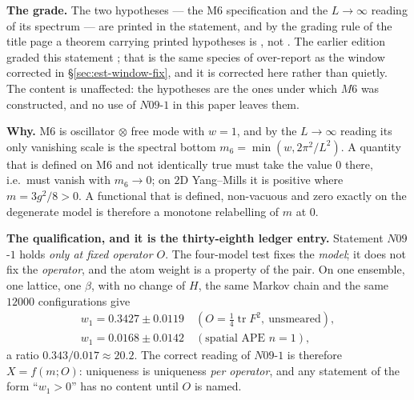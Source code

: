 \noindent\textbf{The grade.} The two hypotheses --- the M6 specification and the $L\to\infty$ reading
of its spectrum --- are printed in the statement, and by the grading rule of the title page a theorem
carrying printed hypotheses is \LC, not \LT. The earlier edition graded this statement \LT; that is
the same species of over-report as the window corrected in \S\ref{sec:est-window-fix}, and it is
corrected here rather than quietly. The content is unaffected: the hypotheses are the ones under
which $M6$ was constructed, and no use of $N09$-$1$ in this paper leaves them.

\noindent\textbf{Why.} M6 is oscillator $\otimes$ free mode with $w=1$, and by the $L\to\infty$
reading its only vanishing scale is the spectral bottom $m_6=\min(w,2\pi^2/L^2)$. A quantity that is
defined on M6 and not identically true must take the value $0$ there, i.e.\ must vanish with
$m_6\to0$; on $2$D Yang--Mills it is positive where $m=3g^2/8>0$. A functional that is defined,
non-vacuous and zero exactly on the degenerate model is therefore a monotone relabelling of $m$ at
$0$. 

\smallskip
\noindent\textbf{The qualification, and it is the thirty-eighth ledger entry.} Statement
$N09$-$1$ holds \emph{only at fixed operator $O$}. The four-model test fixes the \emph{model}; it
does not fix the \emph{operator}, and the atom weight is a property of the pair. On one ensemble, one
lattice, one $\beta$, with no change of $H$, the same Markov chain and the same $12000$
configurations give
\begin{equation}
\begin{gathered}
w_1=0.3427\pm0.0119\quad(O=\tfrac14\operatorname{tr}F^2,\ \text{unsmeared}),\\
w_1=0.0168\pm0.0142\quad(\text{spatial APE }n=1),
\end{gathered}
\label{eq:est-w1op}
\end{equation}
a ratio $0.343/0.017\approx20.2$. The correct reading of $N09$-$1$ is therefore
$X=f(m;O)$: uniqueness is uniqueness \emph{per operator}, and any statement of the form
``$w_1>0$'' has no content until $O$ is named.
\begin{sloppypar}
\noindent{}
\end{sloppypar}


